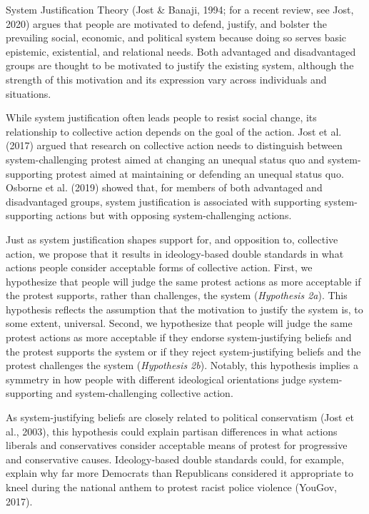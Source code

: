 \documentclass[twocolumn, 11pt, letterpaper]{article}
\begin{document}
System Justification Theory (Jost \& Banaji, 1994; for a recent review,
see Jost, 2020) argues that people are motivated to defend, justify, and
bolster the prevailing social, economic, and political system because
doing so serves basic epistemic, existential, and relational needs. Both
advantaged and disadvantaged groups are thought to be motivated to
justify the existing system, although the strength of this motivation
and its expression vary across individuals and situations.

While system justification often leads people to resist social change,
its relationship to collective action depends on the goal of the action.
Jost et al. (2017) argued that research on collective action needs to
distinguish between system-challenging protest aimed at changing an
unequal status quo and system-supporting protest aimed at maintaining or
defending an unequal status quo. Osborne et al. (2019) showed that, for
members of both advantaged and disadvantaged groups, system
justification is associated with supporting system-supporting actions
but with opposing system-challenging actions.

Just as system justification shapes support for, and opposition to,
collective action, we propose that it results in ideology-based double
standards in what actions people consider acceptable forms of collective
action. First, we hypothesize that people will judge the same protest
actions as more acceptable if the protest supports, rather than
challenges, the system (\emph{Hypothesis 2a}). This hypothesis reflects
the assumption that the motivation to justify the system is, to some
extent, universal. Second, we hypothesize that people will judge the
same protest actions as more acceptable if they endorse
system-justifying beliefs and the protest supports the system or if they
reject system-justifying beliefs and the protest challenges the system
(\emph{Hypothesis 2b}). Notably, this hypothesis implies a symmetry in
how people with different ideological orientations judge
system-supporting and system-challenging collective action.

As system-justifying beliefs are closely related to political
conservatism (Jost et al., 2003), this hypothesis could explain partisan
differences in what actions liberals and conservatives consider
acceptable means of protest for progressive and conservative causes.
Ideology-based double standards could, for example, explain why far more
Democrats than Republicans considered it appropriate to kneel during the
national anthem to protest racist police violence (YouGov, 2017).
\end{document}
